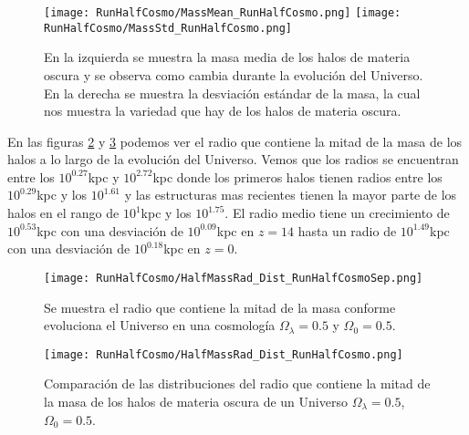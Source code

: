 \begin{figure}[H]
    \centering
    \texttt{[image: RunHalfCosmo/MassMean\_RunHalfCosmo.png]}
    \texttt{[image: RunHalfCosmo/MassStd\_RunHalfCosmo.png]}
    \caption[Media y desviación estándar de la distribución de masa de un Universo $\Omega_\lambda = 0.5$, $\Omega_0 = 0.5$]{\footnotesize En la izquierda se muestra la masa media de los halos de materia oscura y se observa como cambia durante la evolución del Universo. En la derecha se muestra la desviación estándar de la masa, la cual nos muestra la variedad que hay de los halos de materia oscura.}
    \label{fig:HalfCosmo-MassStats}
\end{figure}

En las figuras \ref{fig:HalfCosmo-HalfMassRadDistSep} y \ref{fig:HalfCosmo-HalfMassRadDist} podemos ver el radio que contiene la mitad de la masa de los halos a lo largo de la evolución del Universo. Vemos que los radios se encuentran entre los $10^{0.27}$kpc y $10^{2.72}$kpc donde los primeros halos tienen radios entre los $10^{0.29}$kpc y los $10^{1.61}$ y las estructuras mas recientes tienen la mayor parte de los halos en el rango de $10^{1}$kpc y los $10^{1.75}$. El radio medio tiene un crecimiento de $10^{0.53}$kpc con una desviación de $10^{0.09}$kpc en $z=14$ hasta un radio de $10^{1.49}$kpc con una desviación de $10^{0.18}$kpc en $z=0$.

\begin{figure}[H]
    \centering
    \texttt{[image: RunHalfCosmo/HalfMassRad\_Dist\_RunHalfCosmoSep.png]}
    \caption[Radio que contiene la mitad de la masa en la evolución de un Universo $\Omega_\lambda = 0.5 $, $\Omega_0 = 0.5$]{\footnotesize Se muestra el radio que contiene la mitad de la masa conforme evoluciona el Universo en una cosmología $\Omega_\lambda = 0.5 $ y $\Omega_0 = 0.5$.}
    \label{fig:HalfCosmo-HalfMassRadDistSep}
\end{figure}

\begin{figure}[H]
    \centering
    \texttt{[image: RunHalfCosmo/HalfMassRad\_Dist\_RunHalfCosmo.png]}
    \caption[Distribución del Radio que contiene la mitad de la masa de un Universo $\Omega_\lambda = 0.5 $, $\Omega_0 = 0.5$]{\footnotesize Comparación de las distribuciones del radio que contiene la mitad de la masa de los halos de materia oscura de un Universo $\Omega_\lambda = 0.5 $, $\Omega_0 = 0.5$.}
    \label{fig:HalfCosmo-HalfMassRadDist}
\end{figure}

